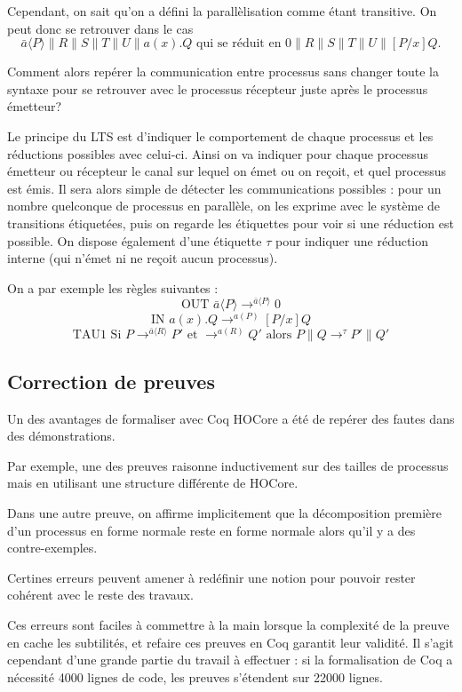 \documentclass[11pt]{article}
\begin{document}
Cependant, on sait qu'on a défini la parallèlisation comme étant transitive. On peut donc se retrouver dans le cas
$$\bar{a}\langle P\rangle\|R\|S\|T\|U\|a(x).Q \text{ qui se réduit en } 0\|R\|S\|T\|U\|[P/x]Q.$$

Comment alors repérer la communication entre processus sans changer toute la syntaxe pour se retrouver avec le processus récepteur juste après le processus émetteur?

Le principe du LTS est d'indiquer le comportement de chaque processus et les réductions possibles avec celui-ci. Ainsi on va indiquer pour chaque processus émetteur ou récepteur le canal sur lequel on émet ou on reçoit, et quel processus est émis. Il sera alors simple de détecter les communications possibles : pour un nombre quelconque de processus en parallèle, on les exprime avec le système de transitions étiquetées, puis on regarde les étiquettes pour voir si une réduction est possible. On dispose également d'une étiquette $\tau$ pour indiquer une réduction interne (qui n'émet ni ne reçoit aucun processus).

On a par exemple les règles suivantes : 
$$\text{OUT } \bar{a}\langle P\rangle \rightarrow^{\bar{a}\langle P\rangle} 0$$
$$\text{IN } a(x).Q \rightarrow^{a(P)}[P/x]Q$$
$$\text{TAU1 Si } P\rightarrow^{\bar{a}\langle R\rangle} P' \text{ et } \rightarrow^{a(R)} Q' \text{ alors } P\|Q \rightarrow^{\tau} P'\|Q'$$





\subsection{Correction de preuves}
Un des avantages de formaliser avec Coq HOCore a été de repérer des fautes dans des démonstrations.

Par exemple, une des preuves raisonne inductivement sur des tailles de processus mais en utilisant une structure différente de HOCore.

Dans une autre preuve, on affirme implicitement que la décomposition première d'un processus en forme normale reste en forme normale alors qu'il y a des contre-exemples.

Certines erreurs peuvent amener à redéfinir une notion pour pouvoir rester cohérent avec le reste des travaux.

Ces erreurs sont faciles à commettre à la main lorsque la complexité de la preuve en cache les subtilités, et refaire ces preuves en Coq garantit leur validité. Il s'agit cependant d'une grande partie du travail à effectuer : si la formalisation de Coq a nécessité 4000 lignes de code, les preuves s'étendent sur 22000 lignes. 
\end{document}
